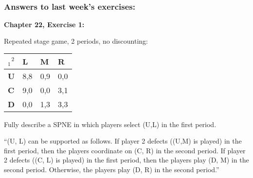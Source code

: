 \documentclass[handout]{beamer}
\begin{document}
\begin{frame}%

\frametitle{\textbf{Answers to last week's exercises:}}

\textbf{Chapter 22, Exercise 1:}\bigskip

\bigskip Repeated stage game, 2 periods, no discounting:

\begin{tabular}{|l|l|l|l|}
\hline
$_{1}^{\text{ \ \ \ \ }2}$ & \textbf{L} & \textbf{M} & \textbf{R} \\ \hline
\textbf{U} & 8,8 & 0,9 & 0,0 \\ \hline
\textbf{C} & 9,0 & 0,0 & 3,1 \\ \hline
\textbf{D} & 0,0 & 1,3 & 3,3 \\ \hline
\end{tabular}

\bigskip

\pause%
Fully describe a SPNE in which players select (U,L) in the first period.

\textquotedblleft (U, L) can be supported as follows. If player 2 defects
((U,M) is played) in the first period, then the players coordinate on (C, R)
in the second period. If player 2 defects ((C, L) is played) in the first
period, then the players play (D, M) in the second period. Otherwise, the
players play (D, R) in the second period.\textquotedblright

\end{frame}%
\end{document}
